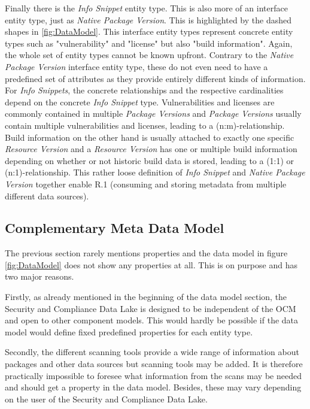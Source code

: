 Finally there is the \emph{Info Snippet} entity type. This is also more of an interface entity type, just as \emph{Native Package Version}. This is highlighted by the dashed shapes in \ref{fig:DataModel}. This interface entity types represent concrete entity types such as "vulnerability" and "license" but also "build information". Again, the whole set of entity types cannot be known upfront. Contrary to the \emph{Native Package Version} interface entity type, these do not even need to have a predefined set of attributes as they provide entirely different kinds of information. For \emph{Info Snippets}, the concrete relationships and the respective cardinalities depend on the concrete \emph{Info Snippet} type. Vulnerabilities and licenses are commonly contained in multiple \emph{Package Versions} and \emph{Package Versions} usually contain multiple vulnerabilities and licenses, leading to a (n:m)-relationship. Build information on the other hand is usually attached to exactly one specific \emph{Resource Version} and a \emph{Resource Version} has one or multiple build information depending on whether or not historic build data is stored, leading to a (1:1) or (n:1)-relationship. This rather loose definition of \emph{Info Snippet} and \emph{Native Package Version} together enable R.1 (consuming and storing metadata from multiple different data sources).\par

\subsection{Complementary Meta Data Model}
The previous section rarely mentions properties and the data model in figure \ref{fig:DataModel} does not show any properties at all. This is on purpose and has two major reasons.\par 
Firstly, as already mentioned in the beginning of the data model section, the Security and Compliance Data Lake is designed to be independent of the OCM and open to other component models. This would hardly be possible if the data model would define fixed predefined properties for each entity type.\par
Secondly, the different scanning tools provide a wide range of information about packages and other data sources but scanning tools may be added. It is therefore practically impossible to foresee what information from the scans may be needed and should get a property in the data model. Besides, these may vary depending on the user of the Security and Compliance Data Lake.\\

